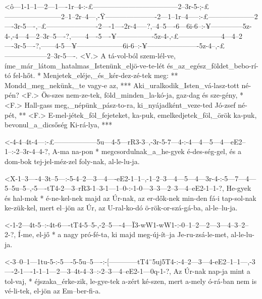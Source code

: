 
  {<ô---1-1--1---2---1----1r--4-:-£------------------------------------2--3r-5-;-£------------------------2--1--2r--4---,-Ÿ----------------------2---1--1r--4-----:-£--------------------2----3r-5----,--£----------------------2----1----2r-4-----?,--4--5----6---6i-6--:-¥--------------5z-4-,-4---4---2--3r--5----?,------4----5----¥----------------5z-4-,-£------------------4---4--2----3r-5----?,------4-5---¥--------------------6i-6--:-¥----------------------5z-4--,-£------------------2--3r-5----.}
  {<V.> A tá-vol-ból szem-lél-ve, íme_már_látom_hatalmas_Istenünk_eljö-ve-te-lét és_az_egész_földet_bebo-rí-tó fel-hőt. * Menjetek_eléje,_és_kér-dez-zé-tek meg: ** Mondd_meg_nekünk,_te vagy-e  az, *** Aki_uralkodik_Isten_vá-lasz-tott né-pén? <F.> Ös-szes nem-ze-tek, föld_minden_la-kó-ja, gaz-dag és sze-gény, * <F.> Hall-gass meg,_népünk_pász-to-ra, ki_nyájadként_veze-ted Jó-zsef né-pét, ** <F.> E-mel-jétek_föl_fejeteket, ka-puk, emelkedjetek_föl,_örök ka-puk, bevonul_a_dicsőség Ki-rá-lya, ***}


  {<-4-4--4t-4---:-£------------------5u---4-5---rR3-3--,-3r-5-7---4-:-4---4---5---4---eE2--1--:-2--3r-4--4-?,}
  {  A-ma na-pon * megcsordulnak_a_he-gyek é-des-ség-gel, és a dom-bok tej-jel-méz-zel foly-nak, al-le-lu-ja.}

  {<X-1--3----4--3t--5---:-5-4--2---3---4----eE2-1--1--,-1--2--3---4---5---4---3r-4-:-5---7---4---5--5u--5--,-5----tT4-2---3--rR3-1--3-1---1--0-:-1-0---3--3---2--3---4--eE2-1--1-?,}
  {   He-gyek és hal-mok * é-ne-kel-nek majd az  Úr-nak, az er-dők-nek min-den fá-i   tap-sol-nak ke-zük-kel, mert el--jön az Úr, az U-ral-ko-dó  ö-rök-or-szá-gá-ba, al-le--lu-ja.}

  {<-1-2---4t-5--:-4t-6----tT4-5--5-,-2--5----4---Ï3-wW1-wW1-:-0--1--2---2--–3---4--3--2--2-?,}
  {  Í-me, el-jő * a  nagy pró-fé-ta, ki majd meg-új-ít--ja    Je-ru-zsá-le-met, al-le-lu-ja.}

  {<-3--0--1---1tu-5-:-5----5-5u--5----:-[------------tT4¨5uj5T4-:-4--2---3---4-eE2--1--1---,-3----2-1----1-1--1---2---3--4t-4--3--:-2--3---4--eE2-1---0q-1-?,}
  {  Az Úr-nak nap-ja  mint a tol-vaj, * éjszaka_érke-zik,         le-gye-tek a-zért ké-szen, mert a-mely ó-rá-ban nem is vé-li-tek, el-jön az Em--ber-fi-a.}

